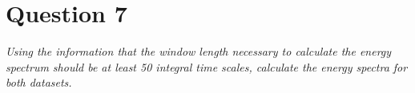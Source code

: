 \section*{Question 7}
\textit{Using the information that the window length necessary to calculate the energy spectrum should be at least 50 integral time scales, calculate the energy spectra for both datasets.}